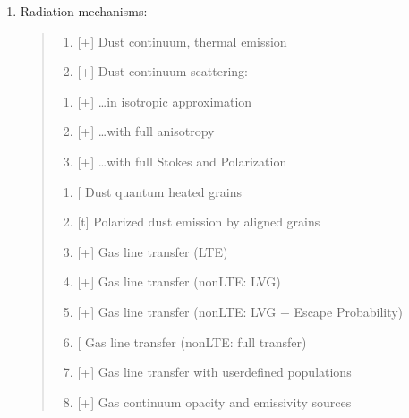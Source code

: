 \documentclass[letterpaper,10pt,english]{sphinxmanual}
\begin{document}
\begin{enumerate}
%
\item {} 
Radiation mechanisms:
\begin{quote}
\begin{enumerate}
%
\item {} 
{[}+{]} Dust continuum, thermal emission

\item {} 
{[}+{]} Dust continuum scattering:

\end{enumerate}
\begin{enumerate}
%
\item {} 
{[}+{]} …in isotropic approximation

\item {} 
{[}+{]} …with full anisotropy

\item {} 
{[}+{]} …with full Stokes and Polarization

\end{enumerate}
\begin{enumerate}
%
\item {} 
{[}\sphinxhyphen{}{]} Dust quantum heated grains 

\item {} 
{[}t{]} Polarized dust emission by aligned grains 

\item {} 
{[}+{]} Gas line transfer (LTE)

\item {} 
{[}+{]} Gas line transfer (non\sphinxhyphen{}LTE: LVG)

\item {} 
{[}+{]} Gas line transfer (non\sphinxhyphen{}LTE: LVG + Escape Probability)

\item {} 
{[}\sphinxhyphen{}{]} Gas line transfer (non\sphinxhyphen{}LTE: full transfer)

\item {} 
{[}+{]} Gas line transfer with user\sphinxhyphen{}defined populations

\item {} 
{[}+{]} Gas continuum opacity and emissivity sources


\end{enumerate}
\end{quote}
\end{enumerate}
\end{document}

